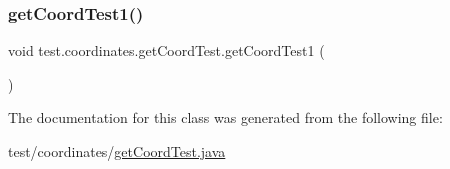 \subsubsection{\texorpdfstring{get\+Coord\+Test1()}{getCoordTest1()}}
{\footnotesize\ttfamily void test.\+coordinates.\+get\+Coord\+Test.\+get\+Coord\+Test1 (\begin{DoxyParamCaption}{ }\end{DoxyParamCaption})}



The documentation for this class was generated from the following file\+:\begin{DoxyCompactItemize}
\item 
test/coordinates/\hyperlink{get_coord_test_8java}{get\+Coord\+Test.\+java}\end{DoxyCompactItemize}
